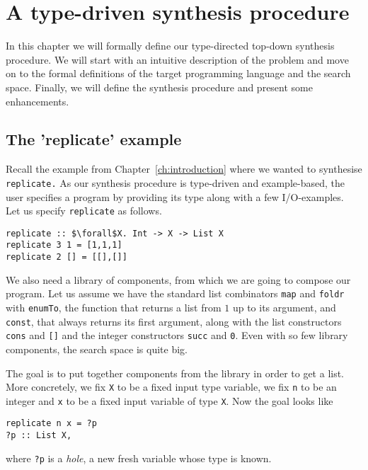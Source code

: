 \lstset{style=plain}

\chapter{A type-driven synthesis procedure} \label{ch:definitions}

In this chapter we will formally define our type-directed top-down synthesis procedure. We will start with an intuitive description of the problem and move on to the formal definitions of the target programming language and the search space. Finally, we will define the synthesis procedure and present some enhancements.

\section{The 'replicate' example}

Recall the example from Chapter~\ref{ch:introduction} where we wanted to synthesise \lstinline?replicate.? As our synthesis procedure is type-driven and example-based, the user specifies a program by providing its type along with a few I/O-examples.\\
Let us specify \lstinline?replicate? as follows.
\begin{lstlisting}[style=plain]
replicate :: $\forall$X. Int -> X -> List X
replicate 3 1 = [1,1,1]
replicate 2 [] = [[],[]]
\end{lstlisting}

We also need a library of components, from which we are going to compose our program. Let us assume we have the standard list combinators \lstinline?map? and \lstinline?foldr? with \lstinline?enumTo?, the function that returns a list from $1$ up to its argument, and \lstinline?const?, that always returns its first argument, along with the list constructors \lstinline?cons? and \lstinline?[]? and the integer constructors \lstinline?succ? and \lstinline?0?. Even with so few library components, the search space is quite big.

The goal is to put together components from the library in order to get a list. More concretely, we fix \lstinline?X? to be a fixed input type variable, we fix \lstinline?n? to be an integer and \lstinline?x? to be a fixed input variable of type \lstinline?X?. Now the goal looks like
\begin{lstlisting}[style=plain]
replicate n x = ?p
?p :: List X,
\end{lstlisting}
where \lstinline!?p! is a \emph{hole}, a new fresh variable whose type is known.

